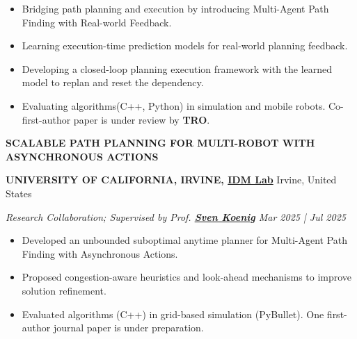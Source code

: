\documentclass[a4paper,9pt]{extarticle}
\begin{document}
\begin{itemize}
    \item Bridging path planning and execution by introducing Multi-Agent Path Finding with Real-world Feedback. 
    \item Learning execution-time prediction models for real-world planning feedback.
    \item Developing a closed-loop planning execution framework with the learned model to replan and reset the dependency. 
    \item Evaluating algorithms(C++, Python) in simulation and mobile robots. Co-first-author paper is under review by \textbf{TRO}.
\end{itemize}
{\textbf{\fontsize{12pt}{4pt}\selectfont S}\textbf{\scshape CALABLE PATH PLANNING FOR MULTI-ROBOT WITH ASYNCHRONOUS ACTIONS}}
\par\vspace{4pt}\noindent
\par\textbf{UNIVERSITY OF CALIFORNIA, IRVINE, {\href{https://idm-lab.org/group.html}{IDM Lab}}} \hfill Irvine, United States  %
\par\textit{Research Collaboration; Supervised by Prof. {\href{https://idm-lab.org/index.html}{\textbf{Sven Koenig}}} \hfill  Mar 2025 | Jul 2025}  %
\begin{itemize}
    \item Developed an unbounded suboptimal anytime planner for Multi-Agent Path Finding with Asynchronous Actions.
    \item Proposed congestion-aware heuristics and look-ahead mechanisms to improve solution refinement.
    \item Evaluated algorithms (C++) in grid-based simulation (PyBullet). One first-author journal paper is under preparation.
\end{itemize}
\end{document}
